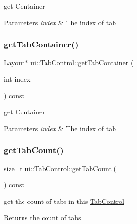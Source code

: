 get Container 
\begin{DoxyParams}{Parameters}
{\em index} & The index of tab \\
\hline
\end{DoxyParams}
\mbox{\label{classui_1_1TabControl_a92075148e4191162362183f3729abc60}} 
\subsubsection{\texorpdfstring{get\+Tab\+Container()}{getTabContainer()}\hspace{0.1cm}{\footnotesize\ttfamily [2/2]}}
{\footnotesize\ttfamily \hyperlink{classui_1_1Layout}{Layout}$\ast$ ui\+::\+Tab\+Control\+::get\+Tab\+Container (\begin{DoxyParamCaption}\item[{int}]{index }\end{DoxyParamCaption}) const}

get Container 
\begin{DoxyParams}{Parameters}
{\em index} & The index of tab \\
\hline
\end{DoxyParams}
\mbox{\label{classui_1_1TabControl_a85ad9aa8633df37bd11b99ecce6ad8ee}} 
\subsubsection{\texorpdfstring{get\+Tab\+Count()}{getTabCount()}\hspace{0.1cm}{\footnotesize\ttfamily [1/2]}}
{\footnotesize\ttfamily size\+\_\+t ui\+::\+Tab\+Control\+::get\+Tab\+Count (\begin{DoxyParamCaption}{ }\end{DoxyParamCaption}) const}

get the count of tabs in this \hyperlink{classui_1_1TabControl}{Tab\+Control} \begin{DoxyReturn}{Returns}
the count of tabs 
\end{DoxyReturn}
\mbox{\label{classui_1_1TabControl_a85ad9aa8633df37bd11b99ecce6ad8ee}} 
